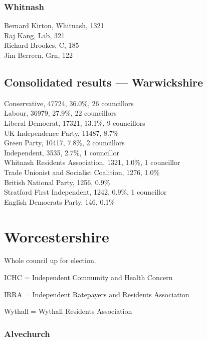 \documentclass[a4paper,openany,10pt]{book}
\begin{document}
\subsubsection*{Whitnash}



Bernard Kirton, Whitnash, 1321\\
Raj Kang, Lab, 321\\
Richard Brookes, C, 185\\
Jim Berreen, Grn, 122\\




\subsection*{Consolidated results --- Warwickshire}
Conservative, 47724, 36.0\%, 26 councillors\\
Labour, 36979, 27.9\%, 22 councillors\\
Liberal Democrat, 17321, 13.1\%, 9 councillors\\
UK Independence Party, 11487, 8.7\% \\
Green Party, 10417, 7.8\%, 2 councillors\\
Independent, 3535, 2.7\%, 1 councillor\\
Whitnash Residents Association, 1321, 1.0\%, 1 councillor\\
Trade Unionist and Socialist Coalition, 1276, 1.0\% \\
British National Party, 1256, 0.9\% \\
Stratford First Independent, 1242, 0.9\%, 1 councillor\\
English Democrats Party, 146, 0.1\% \\


\vfill\eject

\section{Worcestershire}

Whole council up for election.

ICHC = Independent Community and Health Concern

IRRA = Independent Ratepayers and Residents Association

Wythall = Wythall Residents Association



\subsubsection*{Alvechurch}
\end{document}
